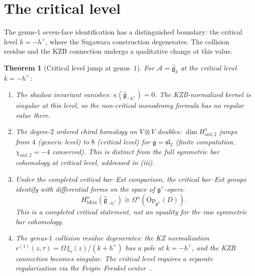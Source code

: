\documentclass[11pt]{article}
\theoremstyle{plain}
\newtheorem{theorem}{Theorem}[section]
\theoremstyle{definition}
\theoremstyle{remark}
\newcommand{\fg}{\mathfrak{g}}
\newcommand{\fsl}{\mathfrak{sl}}
\newcommand{\cA}{\mathcal{A}}
\numberwithin{equation}{section}
\begin{document}

\section{The critical level}\label{sec:critical-level}

The genus-$1$ seven-face identification has a distinguished boundary:
the critical level $k = -h^\vee$, where the Sugawara construction
degenerates. The collision residue and the KZB connection undergo a
qualitative change at this value.

\begin{theorem}[Critical level jump at
genus~$1$]\label{thm:critical-level-g1}
For $\cA = \widehat{\fg}_k$ at the critical level $k = -h^\vee$:
\begin{enumerate}[label=\textup{(\roman*)}]
\item The shadow invariant vanishes:
$\kappa(\widehat{\fg}_{-h^\vee}) = 0$. The KZB-normalized kernel is
singular at this level, so the non-critical monodromy formula has no
regular value there.
\item The degree-$2$ ordered chiral homology on $V \otimes V$ doubles:
$\dim H^1_{\mathrm{ord}, 2}$ jumps from $4$ (generic level) to $8$
(critical level) for $\fg = \fsl_2$ \textup{(}finite computation,
$\chi_{\mathrm{ord}, 2} = -4$ conserved\textup{)}. This is distinct from
the full symmetric bar cohomology at critical level, addressed in (iii).
\item Under the completed critical bar--Ext comparison, the critical
bar--Ext groups identify with differential forms on the space of
\(\fg^\vee\)-opers:
\[
H^n_{\mathrm{bExt}}(\widehat{\fg}_{-h^\vee})
\cong \Omega^n(\mathrm{Op}_{\fg^\vee}(D)).
\]
This is a completed critical statement, not an equality for the raw
symmetric bar cohomology.
\item The genus-$1$ collision residue degenerates: the KZ normalization
$r^{(1)}(z,\tau) = \Omega\,\xi_\tau(z)/(k+h^\vee)$ has a pole at
$k = -h^\vee$, and the KZB connection becomes singular. The critical
level requires a separate regularization via the Feigin--Frenkel
center~\cite{FeiginFrenkel94}.
\end{enumerate}
\end{theorem}
\end{document}

